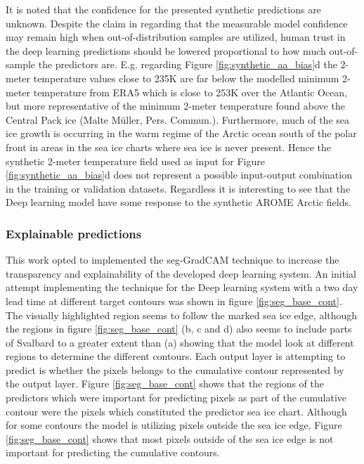 \documentclass[../main/thesis]{subfiles}
\begin{document}
It is noted that the confidence for the presented synthetic predictions are unknown. Despite the claim in \citet{DeVries2018} regarding that the measurable model confidence may remain high when out-of-distribution samples are utilized, human trust in the deep learning predictions should be lowered proportional to how much out-of-sample the predictors are. E.g. regarding Figure \ref{fig:synthetic_aa_bias}d the 2-meter temperature values close to 235K are far below the modelled minimum 2-meter temperature from ERA5 which is close to 253K over the Atlantic Ocean, but more representative of the minimum 2-meter temperature found above the Central Pack ice (Malte Müller, Pers. Commun.). Furthermore, much of the sea ice growth is occurring in the warm regime of the Arctic ocean south of the polar front \citep{Johannessen1978} in areas in the sea ice charts where sea ice is never present. Hence the synthetic 2-meter temperature field used as input for Figure \ref{fig:synthetic_aa_bias}d does not represent a possible input-output combination in the training or validation datasets. Regardless it is interesting to see that the Deep learning model have some response to the synthetic AROME Arctic fields.

\subsubsection{Explainable predictions}
\label{sec:discuss_seggradcam}
This work opted to implemented the seg-GradCAM technique \citep{Vinogradova2020} to increase the transparency and explainability of the developed deep learning system. An initial attempt implementing the technique for the Deep learning system with a two day lead time at different target contours was shown in figure \ref{fig:seg_base_cont}. The visually highlighted region seems to follow the marked sea ice edge, although the regions in figure \ref{fig:seg_base_cont} (b, c and d) also seems to include parts of Svalbard to a greater extent than (a) showing that the model look at different regions to determine the different contours. Each output layer is attempting to predict is whether the pixels belongs to the cumulative contour represented by the output layer. Figure \ref{fig:seg_base_cont} shows that the regions of the predictors which were important for predicting pixels as part of the cumulative contour were the pixels which constituted the predictor sea ice chart. Although for some contours the model is utilizing pixels outside the sea ice edge, Figure \ref{fig:seg_base_cont} shows that most pixels outside of the sea ice edge is not important for predicting the cumulative contours.
\end{document}
